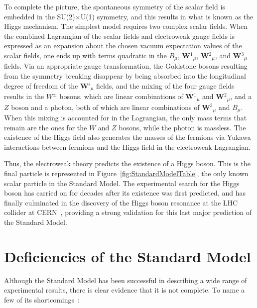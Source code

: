 To complete the picture, the spontaneous symmetry of the scalar field is embedded in the SU(2)$\times$U(1) symmetry, and this results in what is known as the Higgs mechanism. The simplest model requires two complex scalar fields. When the combined Lagrangian of the scalar fields and electroweak gauge fields is expressed as an expansion about the chosen vacuum expectation values of the scalar fields, one ends up with terms quadratic in the $B_{\mu}$, \textbf{W}$^1$$_{\mu}$, \textbf{W}$^2$$_{\mu}$, and \textbf{W}$^3$$_{\mu}$ fields. Via an appropriate gauge transformation, the Goldstone bosons resulting from the symmetry breaking disappear by being absorbed into the longitudinal degree of freedom of the \textbf{W}$^i$$_{\mu}$ fields, and the mixing of the four gauge fields results in the $W^{\pm}$ bosons, which are linear combinations of \textbf{W}$^1$$_{\mu}$ and \textbf{W}$^2$$_{\mu}$, and a $Z$ boson and a photon, both of which are linear combinations of \textbf{W}$^3$$_{\mu}$ and $B_{\mu}$. When this mixing is accounted for in the Lagrangian, the only mass terms that remain are the ones for the $W$ and $Z$ bosons, while the photon is massless. The existence of the Higgs field also generates the masses of the fermions via Yukawa interactions between fermions and the Higgs field in the electroweak Lagrangian.

Thus, the electroweak theory predicts the existence of a Higgs boson. This is the final particle is represented in Figure~\ref{fig:StandardModelTable}, the only known scalar particle in the Standard Model. The experimental search for the Higgs boson has carried on for decades after its existence was first predicted, and has finally culminated in the discovery of the Higgs boson resonance at the LHC collider at CERN~\cite{Aad:2012tfa,Chatrchyan:2012ufa}, providing a strong validation for this last major prediction of the Standard Model.

\section{Deficiencies of the Standard Model\label{sec:SMdeficiencies}}

Although the Standard Model has been successful in describing a wide range of experimental results, there is clear evidence that it is not complete. To name a few of its shortcomings~\cite{BettiniPhysics}:

